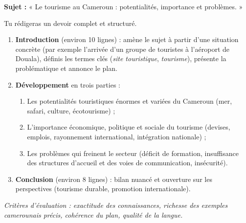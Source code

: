 \documentclass[11pt]{article}
\begin{document}
\begin{exercice}
\textbf{Sujet :} « Le tourisme au Cameroun : potentialités, importance et problèmes. »

Tu rédigeras un devoir complet et structuré.

\begin{enumerate}
\item \textbf{Introduction} (environ 10 lignes) : amène le sujet à partir d'une situation concrète (par exemple l'arrivée d'un groupe de touristes à l'aéroport de Douala), définis les termes clés (\emph{site touristique}, \emph{tourisme}), présente la problématique et annonce le plan.
\item \textbf{Développement} en trois parties :
\begin{enumerate}
\item Les potentialités touristiques énormes et variées du Cameroun (mer, safari, culture, écotourisme) ;
\item L'importance économique, politique et sociale du tourisme (devises, emplois, rayonnement international, intégration nationale) ;
\item Les problèmes qui freinent le secteur (déficit de formation, insuffisance des structures d'accueil et des voies de communication, insécurité).
\end{enumerate}
\item \textbf{Conclusion} (environ 8 lignes) : bilan nuancé et ouverture sur les perspectives (tourisme durable, promotion internationale).
\end{enumerate}

\emph{Critères d'évaluation : exactitude des connaissances, richesse des exemples camerounais précis, cohérence du plan, qualité de la langue.}
\end{exercice}
\end{document}
